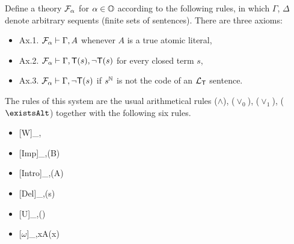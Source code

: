 \documentclass[UKenglish,cleveref,DIV=12]{scrartcl}
\let\forall\forallAlt
\let\exists\existsAlt
\theoremstyle{definition}
\theoremstyle{definition}
\begin{document}
Define a theory $\mathcal{F}_\alpha$ for $\alpha\in\mathbb{O}$ according to the following
rules, in which $\Gamma$, $\Delta$ denote arbitrary sequents (finite sets of
sentences). There are three axioms:
\begin{itemize}
 \item Ax.1. $\mathcal{F}_\alpha\vdash\Gamma,A$ whenever $A$ is a true atomic literal,
 \item Ax.2. $\mathcal{F}_\alpha\vdash\Gamma,\mathsf{T}(s),\lnot \mathsf{T}(s)$ for every closed term $s$,
 \item Ax.3. $\mathcal{F}_\alpha\vdash\Gamma,\lnot \mathsf{T}(s)$ if $s^\mathbb N$ is not the code of an
	$\mathcal{L}_{\mathsf{T}}$ sentence.
\end{itemize}
The rules of this system are the usual arithmetical rules ($\land$), ($\lor_0$),
($\lor_1$), ($\exists$) together with the following six rules.
\begin{itemize}
\item %
	\begin{prooftree}
	\hypo{\FF_\beta\proves\Gamma}
		\hypo{\beta\le\alpha}
	{\FF_\alpha\proves\Gamma,\Delta}
  \end{prooftree}
\item %
	\begin{prooftree}
	[Imp]{\FF_\alpha\proves\Gamma,\T(\gn B)}
  \end{prooftree}
\item %
	\begin{prooftree}
		\hypo{\beta < \alpha}
	[Intro]{\FF_\alpha\proves\Gamma,\T(\gn A)}
  \end{prooftree}
\item %
	\begin{prooftree}
	[Del]{\FF_\alpha\proves\Gamma,\T(s)}
  \end{prooftree}
\item %
	\begin{prooftree}
	\hypo{\FF_\alpha\proves \Gamma,\forall x\,\T(\gn{A(\dot x)})}
	{\FF_\alpha\proves \Gamma,\T(\gn{\forall xA(x)})}
  \end{prooftree}
\item %
	\begin{prooftree}
	[$\omega$]{\FF_\alpha\proves\Gamma,\forall xA(x)}
  \end{prooftree}
\end{itemize}
\end{document}
